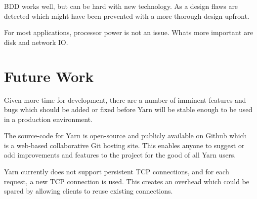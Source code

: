 
BDD works well, but can be hard with new technology. As a design flaws are
detected which might have been prevented with a more thorough design upfront.

For most applications, processor power is not an issue. Whats more important
are disk and network IO.

\section{Future Work}
Given more time for development, there are a number of imminent features and
bugs which should be added or fixed before Yarn will be stable enough to be
used in a production environment.

The source-code for Yarn is open-source and publicly available on Github which
is a web-based collaborative Git hosting site. This enables anyone to suggest
or add improvements and features to the project for the good of all Yarn
users.

Yarn currently does not support persistent TCP connections, and for each
request, a new TCP connection is used. This creates an overhead which could be
spared by allowing clients to reuse existing connections.

